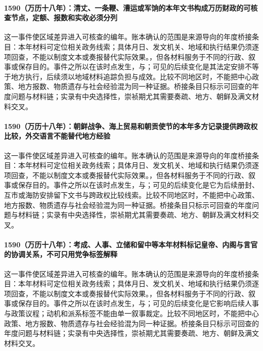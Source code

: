 \paragraph{1590（万历十八年）：清丈、一条鞭、漕运或军饷的本年文书构成万历财政的可核查节点，定额、报数和实收必须分列} 这一事件使区域差异进入可核查的编年。账本确认的范围是来源导向的年度桥接条目：本年材料可定位相关政务线索；具体月日、发文机关、地域和执行结果仍须逐项回查，不能以制度文本或奏报替代实际效果。，但各材料服务于不同的行政、叙事或保存目的。事件之所以在该时点发生，与；可见的后续变化是其法定安排不等于地方执行，后续须以地域材料追踪负担与成效。比较不同地区时，不能把中心政策、地方报数、物质遗存与社会经验混为同一种证据。桥接条目只标示可回查的年度问题与材料链；实录有中央选择性，崇祯期尤其需要奏疏、地方、朝鲜及满文材料交叉。

\paragraph{1590（万历十八年）：朝鲜战争、海上贸易和朝贡使节的本年多方记录提供跨政权比较，外交语言不能替代地方经验} 这一事件使区域差异进入可核查的编年。账本确认的范围是来源导向的年度桥接条目：本年材料可定位相关政务线索；具体月日、发文机关、地域和执行结果仍须逐项回查，不能以制度文本或奏报替代实际效果。，但各材料服务于不同的行政、叙事或保存目的。事件之所以在该时点发生，与；可见的后续变化是它为后续册封、互市或海防安排留下文书与跨政权比较线索。比较不同地区时，不能把中心政策、地方报数、物质遗存与社会经验混为同一种证据。桥接条目只标示可回查的年度问题与材料链；实录有中央选择性，崇祯期尤其需要奏疏、地方、朝鲜及满文材料交叉。

\paragraph{1590（万历十八年）：考成、人事、立储和留中等本年材料标记皇帝、内阁与言官的协调关系，不可只用党争标签解释} 这一事件使区域差异进入可核查的编年。账本确认的范围是来源导向的年度桥接条目：本年材料可定位相关政务线索；具体月日、发文机关、地域和执行结果仍须逐项回查，不能以制度文本或奏报替代实际效果。，但各材料服务于不同的行政、叙事或保存目的。事件之所以在该时点发生，与；可见的后续变化是它影响后续人事与政策议程；动机和派系标签不能由单一叙事裁定。比较不同地区时，不能把中心政策、地方报数、物质遗存与社会经验混为同一种证据。桥接条目只标示可回查的年度问题与材料链；实录有中央选择性，崇祯期尤其需要奏疏、地方、朝鲜及满文材料交叉。

